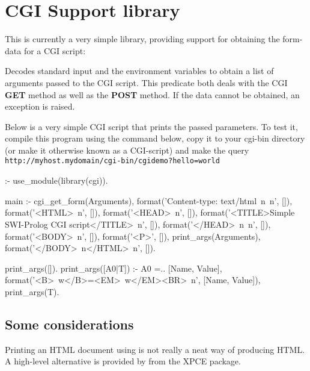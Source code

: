 \documentclass[11pt]{article}
\begin{document}
\section{CGI Support library}

This is currently a very simple library, providing support for obtaining
the form-data for a CGI script:

\begin{description}
Decodes standard input and the environment variables to obtain a list
of arguments passed to the CGI script.  This predicate both deals with
the CGI {\bf GET} method as well as the {\bf POST} method.  If the
data cannot be obtained, an  exception is
raised.
\end{description}

Below is a very simple CGI script that prints the passed parameters.
To test it, compile this program using the command below, copy it to
your cgi-bin directory (or make it otherwise known as a CGI-script) and
make the query \verb$http://myhost.mydomain/cgi-bin/cgidemo?hello=world$

\begin{code}
\end{code}

\noindent
\begin{code}
:- use_module(library(cgi)).

main :-
        cgi_get_form(Arguments),
        format('Content-type: text/html~n~n', []),
        format('<HTML>~n', []),
        format('<HEAD>~n', []),
        format('<TITLE>Simple SWI-Prolog CGI script</TITLE>~n', []),
        format('</HEAD>~n~n', []),
        format('<BODY>~n', []),
        format('<P>', []),
        print_args(Arguments),
        format('</BODY>~n</HTML>~n', []).

print_args([]).
print_args([A0|T]) :-
        A0 =.. [Name, Value],
        format('<B>~w</B>=<EM>~w</EM><BR>~n', [Name, Value]),
        print_args(T).
\end{code}

\noindent
\subsection{Some considerations}

Printing an HTML document using  is not really a neat way
of producing HTML.  A high-level alternative is provided by
 from the XPCE package.
\end{document}

